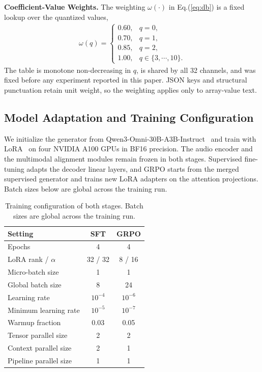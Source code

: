 \noindent\textbf{Coefficient-Value Weights.}\quad
The weighting $\omega(\cdot)$ in Eq.(\ref{eq:db}) is a fixed lookup over the quantized values,
\begin{gather}
\omega(q)=
\begin{cases}
0.60, & q=0,\\
0.70, & q=1,\\
0.85, & q=2,\\
1.00, & q\in\{3,\cdots,10\}.
\end{cases}
\end{gather}
The table is monotone non-decreasing in $q$, is shared by all 32 channels, and was fixed before any experiment reported in this paper. JSON keys and structural punctuation retain unit weight, so the weighting applies only to array-value text.

\subsection{Model Adaptation and Training Configuration}
\label{app:training}

We initialize the generator from Qwen3-Omni-30B-A3B-Instruct~\citep{xu2025qwen3omni} and train with LoRA~\citep{hu2021lora} on four NVIDIA A100 GPUs in BF16 precision. The audio encoder and the multimodal alignment modules remain frozen in both stages. Supervised fine-tuning adapts the decoder linear layers, and GRPO starts from the merged supervised generator and trains new LoRA adapters on the attention projections. Batch sizes below are global across the training run.

\begin{table}[h]
\centering
\caption{Training configuration of both stages. Batch sizes are global across the training run.}
\label{tab:train}
\small
\begin{tabular}{lcc}
\toprule
Setting & SFT & GRPO \\
\midrule
Epochs & 4 & 4 \\
LoRA rank / $\alpha$ & 32 / 32 & 8 / 16 \\
Micro-batch size & 1 & 1 \\
Global batch size & 8 & 24 \\
Learning rate & $10^{-4}$ & $10^{-6}$ \\
Minimum learning rate & $10^{-5}$ & $10^{-7}$ \\
Warmup fraction & 0.03 & 0.05 \\
Tensor parallel size & 2 & 2 \\
Context parallel size & 2 & 1 \\
Pipeline parallel size & 1 & 1 \\
\bottomrule
\end{tabular}
\end{table}

